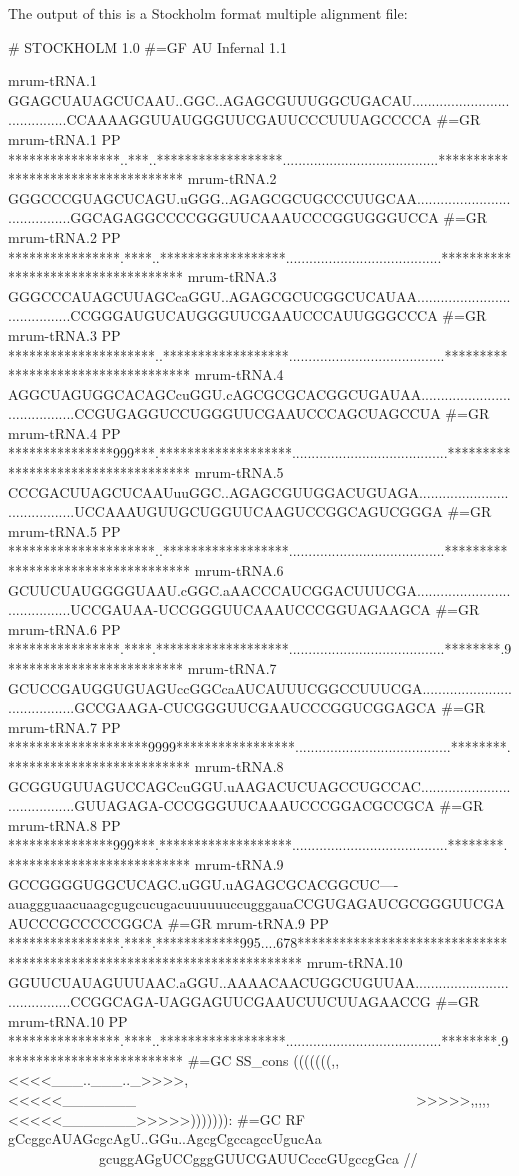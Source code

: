 The output of this is a Stockholm format multiple alignment file:

\begin{tinysreoutput}
# STOCKHOLM 1.0
#=GF AU Infernal 1.1

mrum-tRNA.1          GGAGCUAUAGCUCAAU..GGC..AGAGCGUUUGGCUGACAU........................................CCAAAAGGUUAUGGGUUCGAUUCCCUUUAGCCCCA
#=GR mrum-tRNA.1  PP ****************..***..******************........................................***********************************
mrum-tRNA.2          GGGCCCGUAGCUCAGU.uGGG..AGAGCGCUGCCCUUGCAA........................................GGCAGAGGCCCCGGGUUCAAAUCCCGGUGGGUCCA
#=GR mrum-tRNA.2  PP ****************.****..******************........................................***********************************
mrum-tRNA.3          GGGCCCAUAGCUUAGCcaGGU..AGAGCGCUCGGCUCAUAA........................................CCGGGAUGUCAUGGGUUCGAAUCCCAUUGGGCCCA
#=GR mrum-tRNA.3  PP *********************..******************........................................***********************************
mrum-tRNA.4          AGGCUAGUGGCACAGCcuGGU.cAGCGCGCACGGCUGAUAA........................................CCGUGAGGUCCUGGGUUCGAAUCCCAGCUAGCCUA
#=GR mrum-tRNA.4  PP ***************999***.*******************........................................***********************************
mrum-tRNA.5          CCCGACUUAGCUCAAUuuGGC..AGAGCGUUGGACUGUAGA........................................UCCAAAUGUUGCUGGUUCAAGUCCGGCAGUCGGGA
#=GR mrum-tRNA.5  PP *********************..******************........................................***********************************
mrum-tRNA.6          GCUUCUAUGGGGUAAU.cGGC.aAACCCAUCGGACUUUCGA........................................UCCGAUAA-UCCGGGUUCAAAUCCCGGUAGAAGCA
#=GR mrum-tRNA.6  PP ****************.****.*******************........................................********.9*************************
mrum-tRNA.7          GCUCCGAUGGUGUAGUccGGCcaAUCAUUUCGGCCUUUCGA........................................GCCGAAGA-CUCGGGUUCGAAUCCCGGUCGGAGCA
#=GR mrum-tRNA.7  PP ********************9999*****************........................................********.**************************
mrum-tRNA.8          GCGGUGUUAGUCCAGCcuGGU.uAAGACUCUAGCCUGCCAC........................................GUUAGAGA-CCCGGGUUCAAAUCCCGGACGCCGCA
#=GR mrum-tRNA.8  PP ***************999***.*******************........................................********.**************************
mrum-tRNA.9          GCCGGGGUGGCUCAGC.uGGU.uAGAGCGCACGGCUC----auaggguaacuaagcgugcucugacuuuuuuccugggauaCCGUGAGAUCGCGGGUUCGAAUCCCGCCCCCGGCA
#=GR mrum-tRNA.9  PP ****************.****.************995....678************************************************************************
mrum-tRNA.10         GGUUCUAUAGUUUAAC.aGGU..AAAACAACUGGCUGUUAA........................................CCGGCAGA-UAGGAGUUCGAAUCUUCUUAGAACCG
#=GR mrum-tRNA.10 PP ****************.****..******************........................................********.9*************************
#=GC SS_cons         (((((((,,<<<<___..___.._>>>>,<<<<<_______~~~~~~~~~~~~~~~~~~~~~~~~~~~~~~~~~~~~~~~~>>>>>,,,,,<<<<<_______>>>>>))))))):
#=GC RF              gCcggcAUAGcgcAgU..GGu..AgcgCgccagccUgucAa~~~~~~~~~~~~~~~~~~~~~~~~~~~~~~~~~~~~~~~~gcuggAGgUCCgggGUUCGAUUCcccGUgccgGca
//
\end{tinysreoutput}

